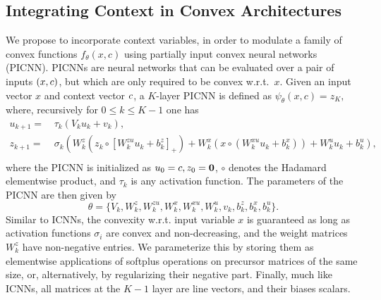 \subsection{Integrating Context in Convex Architectures}%
We propose to incorporate context variables, in order to modulate a family of convex functions $f_{\theta}(x, c)$
using partially input convex neural networks (PICNN). PICNNs are neural networks that can be evaluated over a pair of inputs $(x,c)$, but which are only required to be convex w.r.t.~$x$. Given an input vector $x$ and context vector $c$, a $K$-layer PICNN is defined as $\psi_\theta(x, c) = z_{K},$ where, recursively for $0\leq k \leq K-1$ one has
\begin{equation} \label{eq:picnn}
\begin{aligned} 
u_{k+1} =&\, \tau_{k}\left(V_{k} u_{k}+v_{k}\right), \\
z_{k+1} =&\, \sigma_{k}\left(W_{k}^{z}\left(z_{k} \circ\left[W_{k}^{z u} u_{k}+b_{k}^{z}\right]_+\right)+\right.
\left.W_{k}^{x}\left(x \circ(W_{k}^{x u} u_{k}+b_{k}^{x})\right)+W_{k}^{u} u_{k}+b_{k}^u\right), \\
\end{aligned}
\end{equation}
where the PICNN is initialized as $u_{0}=c, z_0 = \mathbf{0}$, $\circ$ denotes the Hadamard elementwise product, and $\tau_k$ is any activation function. The parameters of the PICNN are then given by
$$\theta = \{ V_{k}, W_{k}^{z}, W_{k}^{z u}, W_{k}^{x}, W_{k}^{x u} , W_{k}^{u}, v_{k}, b_{k}^{z}, b_{k}^{x}, b_{k}^u \}.$$ 
Similar to ICNNs, the convexity w.r.t. input variable $x$ is guaranteed as long as activation functions $\sigma_i$ are convex and non-decreasing, and the weight matrices $W_{k}^{z}$ have non-negative entries. We parameterize this by storing them as elementwise applications of softplus operations on precursor matrices of the same size, or, alternatively, by regularizing their negative part. Finally, much like ICNNs, all matrices at the $K-1$ layer are line vectors, and their biases scalars.


